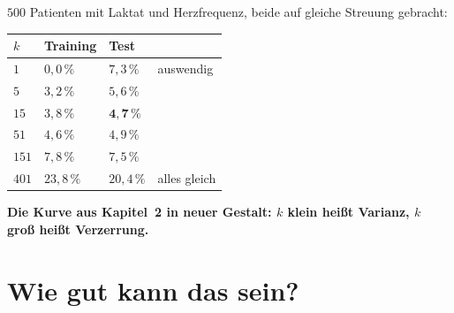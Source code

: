 \begin{merksatz}
$500$ Patienten mit Laktat und Herzfrequenz, beide auf gleiche Streuung gebracht:

\begin{center}
{\small
\renewcommand{\arraystretch}{1.46}
\begin{tabular}{@{}P{1.6cm}P{2.2cm}P{2.2cm}P{2.2cm}@{}}
\toprule
$k$ & \textbf{Training} & \textbf{Test} & \\
\midrule
$1$ & $0{,}0\,\%$ & $7{,}3\,\%$ & auswendig\\
$5$ & $3{,}2\,\%$ & $5{,}6\,\%$ & \\
$15$ & $3{,}8\,\%$ & $\mathbf{4{,}7\,\%}$ & \\
$51$ & $4{,}6\,\%$ & $4{,}9\,\%$ & \\
$151$ & $7{,}8\,\%$ & $7{,}5\,\%$ & \\
$401$ & $23{,}8\,\%$ & $20{,}4\,\%$ & alles gleich\\
\bottomrule
\end{tabular}}
\end{center}

\begin{center}
\begin{minipage}{0.9\textwidth}
\textbf{Die Kurve aus Kapitel~2 in neuer Gestalt: $k$ klein heißt Varianz, $k$ groß heißt Verzerrung.}
\end{minipage}
\end{center}

\begin{center}
\begin{minipage}{0.88\textwidth}
\end{minipage}
\end{center}
\end{merksatz}

\section{Wie gut kann das sein?}

